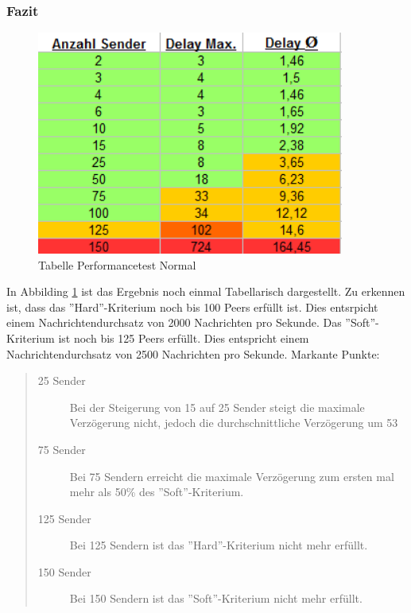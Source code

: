 \subsubsection{Fazit}
\begin{figure}[htH]
\centering
\includegraphics[width=0.9\textwidth]{backend/Tabelle_Performance_Normal.PNG}
\caption{Tabelle Performancetest Normal}
\label{backfig15}
\end{figure}
In Abbilding \ref{backfig15} ist das Ergebnis noch einmal Tabellarisch dargestellt.
Zu erkennen ist, dass das ''Hard''-Kriterium noch bis 100 Peers erfüllt ist. Dies entsrpicht einem Nachrichtendurchsatz von 2000 Nachrichten pro Sekunde. Das ''Soft''-Kriterium ist noch bis 125 Peers erfüllt. Dies entspricht einem Nachrichtendurchsatz von 2500 Nachrichten pro Sekunde. Markante Punkte:
\begin{quote}
  \begin{description}
  \item[25 Sender]
  Bei der Steigerung von 15 auf 25 Sender steigt die maximale Verzögerung nicht, jedoch die durchschnittliche Verzögerung um 53%

  \item[75 Sender]
  Bei 75 Sendern erreicht die maximale Verzögerung zum ersten mal mehr als 50\% des ''Soft''-Kriterium.

  \item[125 Sender]
  Bei 125 Sendern ist das ''Hard''-Kriterium nicht mehr erfüllt.

  \item[150 Sender]
  Bei 150 Sendern ist das ''Soft''-Kriterium nicht mehr erfüllt.
  \end{description}
\end{quote}

